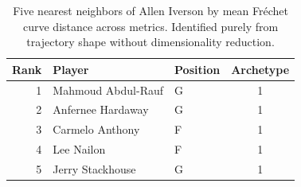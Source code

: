 \begin{table}[htbp]
  \centering\small
  \begin{tabular}{rllc}
    \toprule
    Rank & Player & Position & Archetype \\
    \midrule
    1 & Mahmoud Abdul-Rauf & G & 1 \\
    2 & Anfernee Hardaway & G & 1 \\
    3 & Carmelo Anthony & F & 1 \\
    4 & Lee Nailon & F & 1 \\
    5 & Jerry Stackhouse & G & 1 \\
    \bottomrule
  \end{tabular}
  \caption{Five nearest neighbors of Allen Iverson by mean Fr\'{e}chet curve distance across metrics. Identified purely from trajectory shape without dimensionality reduction.}
  \label{tab:Allen_Iverson_frechet_curve_neighbors}
\end{table}

